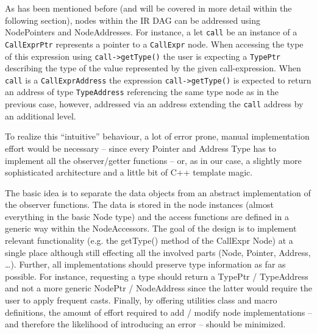 As has been mentioned before (and will be covered in more detail within the
following section), nodes within the IR DAG can be addressed using NodePointers
and NodeAddresses. For instance, a let \lstinline|call|
be an instance of a \lstinline|CallExprPtr| represents a pointer to a
\lstinline|CallExpr| node.
When accessing the type of this expression using \lstinline|call->getType()| the
user is expecting a \lstinline|TypePtr| describing the type of the value
represented by the given call-expression. When \lstinline|call| is a
\lstinline|CallExprAddress| the expression \lstinline|call->getType()| is
expected to return an address of type \lstinline|TypeAddress| referencing the
same type node as in the previous case, however, addressed via an address
extending the \lstinline|call| address by an additional level.

To realize this ``intuitive'' behaviour, a lot of error prone, manual
implementation effort would be necessary -- since every Pointer and Address Type
has to implement all the observer/getter functions -- or, as in our case, a
slightly more sophisticated architecture and a little bit of C++ template
magic.

The basic idea is to separate the data objects from an abstract implementation
of the observer functions. The data is stored in the node instances (almost
everything in the basic Node type) and the access functions are defined in a
generic way within the NodeAccessors. The goal of the design is to implement
relevant functionality (e.g. the getType() method of the CallExpr Node) at a
single place although still effecting all the involved parts (Node, Pointer,
Address, \ldots). Further, all implementations should preserve type information
as far as possible. For instance, requesting a type should return a TypePtr /
TypeAddress and not a more generic NodePtr / NodeAddress since the latter would
require the user to apply frequent casts. Finally, by offering utilities class
and macro definitions, the amount of effort required to add / modify node
implementations -- and therefore the likelihood of introducing an error --
should be minimized.


